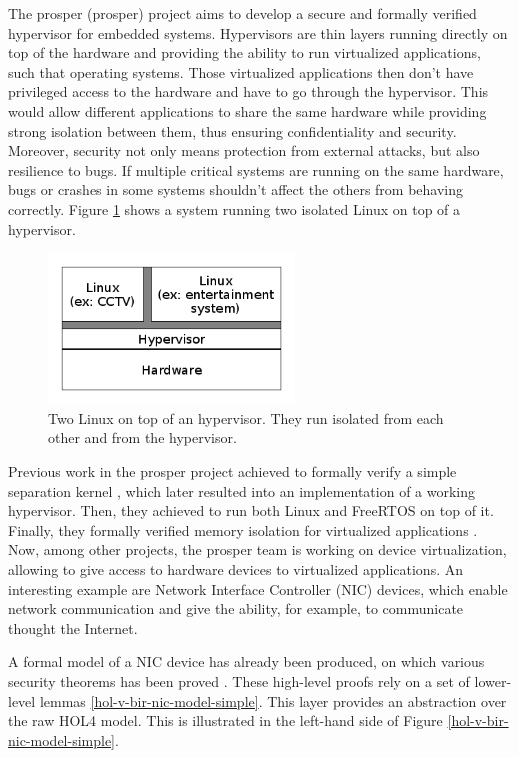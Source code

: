 \documentclass{kththesis}
\begin{document}
The \acrshort{prosper} (\acrlong{prosper}) project \cite{noauthor_prosper:_nodate} aims to develop a secure and formally verified hypervisor for embedded systems. Hypervisors are thin layers running directly on top of the hardware and providing the ability to run virtualized applications, such that operating systems. Those virtualized applications then don't have privileged access to the hardware and have to go through the hypervisor. This would allow different applications to share the same hardware while providing strong isolation between them, thus ensuring confidentiality and security. Moreover, security not only means protection from external attacks, but also resilience to bugs. If multiple critical systems are running on the same hardware, bugs or crashes in some systems shouldn't affect the others from behaving correctly. Figure \ref{2-Linux-on-hypervisor-intro} shows a system running two isolated Linux on top of a hypervisor.

\begin{figure}
	\includegraphics[height=4cm]{figures/figure-1.png}
	\centering
	\caption{
Two Linux on top of an hypervisor. They run isolated from each other and from the hypervisor.
	}
	\label{2-Linux-on-hypervisor-intro}
\end{figure}

Previous work in the \acrshort{prosper} project achieved \cite{noauthor_prosper:_nodate-1} to formally verify a simple separation kernel \cite{dam_formal_2013}, which later resulted into an implementation of a working hypervisor. Then, they achieved to run both Linux and FreeRTOS on top of it. Finally, they formally verified memory isolation for virtualized applications \cite{nemati_trustworthy_2015}. Now, among other projects, the \acrshort{prosper} team is working on device virtualization, allowing to give access to hardware devices to virtualized applications. An interesting example are Network Interface Controller (NIC) devices, which enable network communication and give the ability, for example, to communicate thought the Internet.

A formal model of a NIC device has already been produced, on which various security theorems has been proved \cite{haglund_formal_2016}. These high-level proofs rely on a set of lower-level lemmas \ref{hol-v-bir-nic-model-simple}. This layer provides an abstraction over the raw HOL4 model. This is illustrated in the left-hand side of Figure \ref{hol-v-bir-nic-model-simple}.
\end{document}
